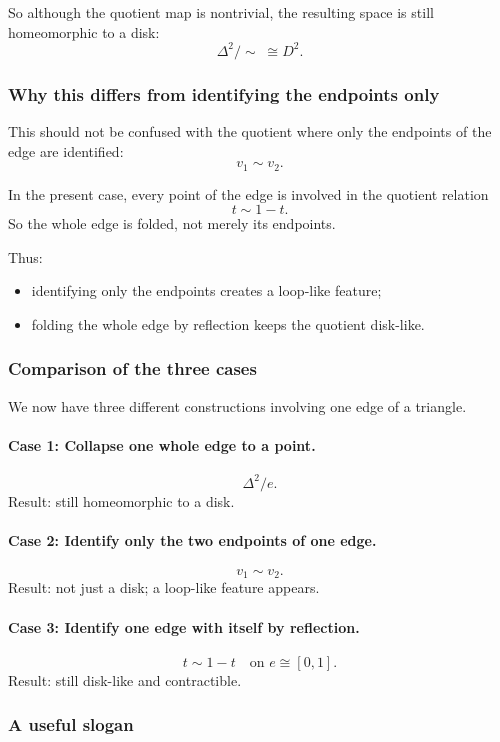\documentclass[12pt,a4paper]{article}
\theoremstyle{notespace}
\begin{document}
So although the quotient map is nontrivial, the resulting space is still homeomorphic to a disk:
\[
\Delta^2/\!\sim \;\cong D^2.
\]

\subsubsection{Why this differs from identifying the endpoints only}

This should not be confused with the quotient where only the endpoints of the edge are identified:
\[
v_1\sim v_2.
\]

In the present case, every point of the edge is involved in the quotient relation
\[
t\sim 1-t.
\]
So the whole edge is folded, not merely its endpoints.

Thus:

\begin{itemize}
	\item identifying only the endpoints creates a loop-like feature;
	\item folding the whole edge by reflection keeps the quotient disk-like.
\end{itemize}

\subsubsection{Comparison of the three cases}

We now have three different constructions involving one edge of a triangle.

\paragraph{Case 1: Collapse one whole edge to a point.}
\[
\Delta^2/e.
\]
Result: still homeomorphic to a disk.

\paragraph{Case 2: Identify only the two endpoints of one edge.}
\[
v_1\sim v_2.
\]
Result: not just a disk; a loop-like feature appears.

\paragraph{Case 3: Identify one edge with itself by reflection.}
\[
t\sim 1-t \quad \text{on } e\cong [0,1].
\]
Result: still disk-like and contractible.

\subsubsection{A useful slogan}
\end{document}

